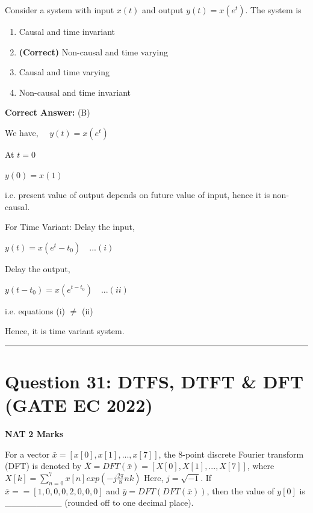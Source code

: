 \documentclass[11pt,a4paper]{article}
\begin{document}
\noindent Consider a system with input $x(t)$ and output $y(t)=x\left(e^{t}\right)$. The system is


\begin{enumerate}[label=(\Alph*)]
    \item Causal and time invariant
    \item \textbf{(Correct)} Non-causal and time varying
    \item Causal and time varying
    \item Non-causal and time invariant
\end{enumerate}

\noindent \textbf{Correct Answer:} (B)

\begin{tcolorbox}[solbox, title=Detailed Solution -- Question 30]
We have, $\quad y(t)=x\left(e^{t}\right)$

At $t=0$

$y(0)=x(1)$

i.e. present value of output depends on future value of input, hence it is non-causal.

For Time Variant:
Delay the input,

$y(t)=x\left(e^{t}-t_{0}\right) \quad . . . (i)$

Delay the output,

$y\left(t-t_{0}\right)=x\left(e^{t-t_{0}}\right) \quad . . . (ii)$

i.e. equations (i) $\neq$ (ii)

Hence, it is time variant system.
\end{tcolorbox}

\vspace{1.5em}
\hrule
\vspace{1.5em}

\section*{Question 31: DTFS, DTFT \& DFT (GATE EC 2022)}
\noindent \textbf{\color{primary}NAT} \hfill \textbf{\color{secondary}2 Marks}


\noindent For a vector $\bar{x}=\left [x[0],x[1],...,x[7]  \right ]$, the 8-point discrete Fourier transform (DFT)
is denoted by $\bar{X}=DFT(\bar{x})=\left [X[0],X[1],...,X[7]  \right ]$, where
$X[k]=\sum_{n=0}^{7}x[n]exp\left ( -j\frac{2 \pi}{8}nk \right )$
 Here, $j=\sqrt{-1}$. If $\bar{x}==[1,0,0,0,2,0,0,0]$ and $\bar{y}=DFT(DFT(\bar{x}))$, then the value
of $y[0]$ is \_\_\_\_\_\_\_\_\_ (rounded off to one decimal place).
\end{document}
